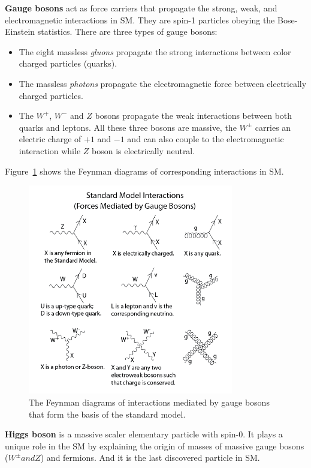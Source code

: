 \textbf{Gauge bosons}
act as force carriers that propagate the strong, weak, and electromagnetic interactions in SM.
They are spin-1 particles obeying the Bose-Einstein statistics. 
There are three types of gauge bosons:
\begin{itemize}
  \item The eight massless \textit{gluons} propagate the strong interactions between color charged particles (quarks).
  \item The massless \textit{photons} propagate the electromagnetic force between electrically charged particles.
  \item The $W^{+}$, $W^{-}$ and $Z$ bosons propagate the weak interactions between both quarks and leptons. All these three bosons are massive, the $W^{\pm}$ carries an electric charge of $+1$ and $−1$ and can also couple to the electromagnetic interaction while $Z$ boson is electrically neutral.
\end{itemize}
Figure~\ref{fig:eleP-2} shows the Feynman diagrams of corresponding interactions in SM.
\begin{figure}[!htb]
  \centering
  \includegraphics[width=0.8\textwidth]{figures/Theory/Standard_Model_Feynman_Diagram_Vertices.png}
  \caption{The Feynman diagrams of interactions mediated by gauge bosons that form the basis of the standard model.}
  \label{fig:eleP-2}
\end{figure}

\textbf{Higgs boson}
is a massive scaler elementary particle with spin-0. 
It plays a unique role in the SM by explaining the origin of masses of massive gauge bosons ($W^{\pm} and Z$) and fermions. 
And it is the last discovered particle in SM.
